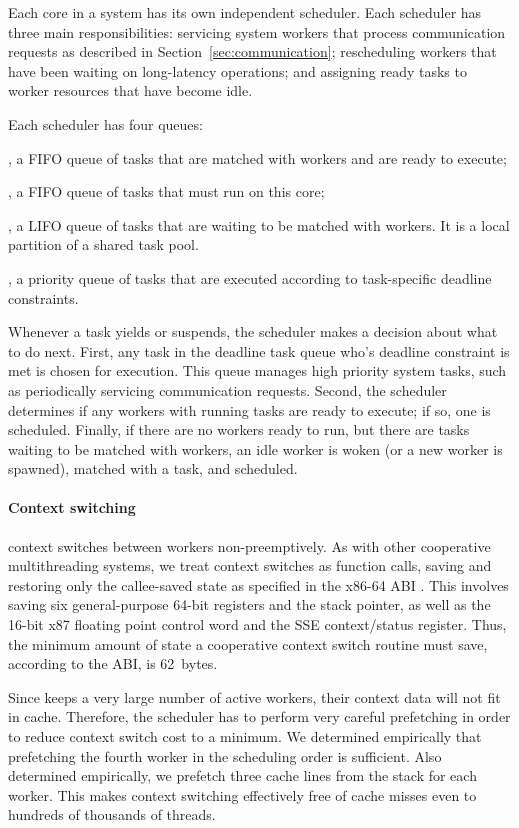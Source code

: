 Each core in a \Grappa system has its own independent scheduler. Each
scheduler has three main responsibilities: servicing system workers that
process communication requests as described in
Section~\ref{sec:communication}; rescheduling workers that have been waiting
on long-latency operations; and assigning ready tasks to worker resources that
have become idle.

Each scheduler has four queues:

, a FIFO queue of tasks that are
  matched with workers and are ready to execute;

, a FIFO queue of tasks that must run on this core;

,  a LIFO queue of tasks that are
  waiting to be matched with workers. It is a local partition of a shared
  task pool.

, a priority queue of tasks that are executed according to task-specific deadline constraints.

Whenever a task yields or suspends, the scheduler makes a decision about what to do next. First, any task in the deadline task queue who's deadline constraint is met is chosen for execution.  This queue manages high priority system tasks, such as periodically servicing communication requests.  Second, the scheduler determines if any workers with running tasks are ready to execute; if so, one is scheduled. Finally, if there are no workers ready to run, but there are tasks waiting to be matched with workers, an idle worker is woken (or a new worker is spawned), matched with a task, and scheduled.

\paragraph{Context switching} \Grappa context switches between workers
non-preemptively. As with other cooperative multithreading systems, we
treat context switches as function calls, saving and restoring only the
callee-saved state as specified in the x86-64 ABI \cite{amd64:abi:2012}. This
involves saving six general-purpose 64-bit registers and the stack
pointer, as well as the 16-bit x87 floating point control word and the
SSE context/status register. Thus, the minimum amount of state a
cooperative context switch routine must save, according to the ABI, is
62~bytes.

Since \Grappa keeps a very large number of active workers, their context data will not fit in cache. Therefore, the scheduler has to perform very careful prefetching in order to reduce context switch cost to a minimum. We determined empirically that prefetching the fourth worker in the scheduling order is sufficient. Also determined empirically, we prefetch three cache lines from the stack for each worker.  This makes context switching effectively free of cache misses even to hundreds of thousands of threads.

